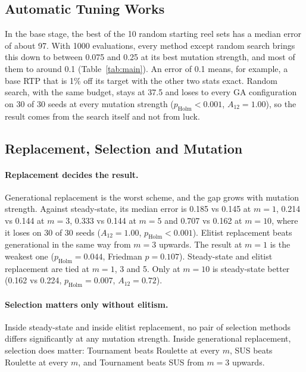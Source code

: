 \subsection{Automatic Tuning Works}
\label{sec:res-works}

In the base stage, the best of the 10 random starting reel sets has a median error of about 97. With 1000 evaluations, every method except random search brings this down to between 0.075 and 0.25 at its best mutation strength, and most of them to around 0.1 (Table~\ref{tab:main}). An error of 0.1 means, for example, a base RTP that is 1\% off its target with the other two stats exact. Random search, with the same budget, stays at 37.5 and loses to every GA configuration on 30 of 30 seeds at every mutation strength ($p_{\mathrm{Holm}} < 0.001$, $A_{12} = 1.00$), so the result comes from the search itself and not from luck.

\subsection{Replacement, Selection and Mutation}
\label{sec:res-ga}

\paragraph{Replacement decides the result.} Generational replacement is the worst scheme, and the gap grows with mutation strength. Against steady-state, its median error is 0.185 vs 0.145 at $m = 1$, 0.214 vs 0.144 at $m = 3$, 0.333 vs 0.144 at $m = 5$ and 0.707 vs 0.162 at $m = 10$, where it loses on 30 of 30 seeds ($A_{12} = 1.00$, $p_{\mathrm{Holm}} < 0.001$). Elitist replacement beats generational in the same way from $m = 3$ upwards. The result at $m = 1$ is the weakest one ($p_{\mathrm{Holm}} = 0.044$, Friedman $p = 0.107$). Steady-state and elitist replacement are tied at $m = 1$, 3 and 5. Only at $m = 10$ is steady-state better (0.162 vs 0.224, $p_{\mathrm{Holm}} = 0.007$, $A_{12} = 0.72$).

\paragraph{Selection matters only without elitism.} Inside steady-state and inside elitist replacement, no pair of selection methods differs significantly at any mutation strength. Inside generational replacement, selection does matter: Tournament beats Roulette at every $m$, SUS beats Roulette at every $m$, and Tournament beats SUS from $m = 3$ upwards.


